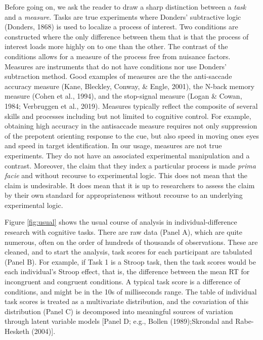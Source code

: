 \documentclass[
  ,man]{apa6}
\begin{document}
Before going on, we ask the reader to draw a sharp distinction between a \emph{task} and a \emph{measure.} Tasks are true experiments where Donders' subtractive logic (Donders, 1868) is used to localize a process of interest. Two conditions are constructed where the only difference between them that is that the process of interest loads more highly on to one than the other. The contrast of the conditions allows for a measure of the process free from nuisance factors. Measures are instruments that do not have conditions nor use Donders' subtraction method. Good examples of measures are the the anti-saccade accuracy measure (Kane, Bleckley, Conway, \& Engle, 2001), the N-back memory measure (Cohen et al., 1994), and the stop-signal measure (Logan \& Cowan, 1984; Verbruggen et al., 2019). Measures typically reflect the composite of several skills and processes including but not limited to cognitive control. For example, obtaining high accuracy in the antisaccade measure requires not only suppression of the prepotent orienting response to the cue, but also speed in moving ones eyes and speed in target identification. In our usage, measures are not true experiments. They do not have an associated experimental manipulation and a contrast. Moreover, the claim that they index a particular process is made \emph{prima facie} and without recourse to experimental logic. This does not mean that the claim is undesirable. It does mean that it is up to researchers to assess the claim by their own standard for appropriateness without recourse to an underlying experimental logic.

Figure \ref{fig:usual} shows the usual course of analysis in individual-difference research with cognitive tasks. There are raw data (Panel A), which are quite numerous, often on the order of hundreds of thousands of observations. These are cleaned, and to start the analysis, task scores for each participant are tabulated (Panel B). For example, if Task 1 is a Stroop task, then the task scores would be each individual's Stroop effect, that is, the difference between the mean RT for incongruent and congruent conditions. A typical task score is a difference of conditions, and might be in the 10s of milliseconds range. The table of individual task scores is treated as a multivariate distribution, and the covariation of this distribution (Panel C) is decomposed into meaningful sources of variation through latent variable models {[}Panel D; e.g., Bollen (1989);Skrondal and Rabe-Hesketh (2004){]}.
\end{document}
